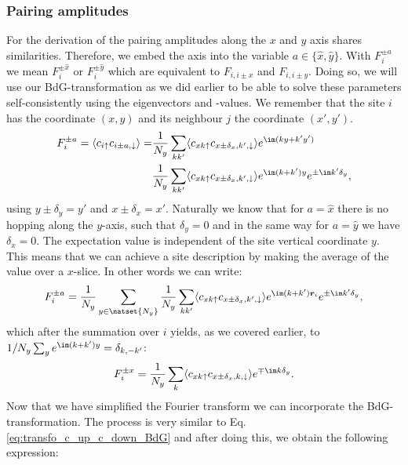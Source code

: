 \documentclass[../main.tex]{subfile}
\begin{document}
\subsubsection{Pairing amplitudes}
For the derivation of the pairing amplitudes along the $x$ and $y$ axis shares similarities. Therefore, we embed the axis into the variable $a\in\{\hat{x},\hat{y}\}$.
With $F_i^{\pm a}$ we mean $F_i^{\pm \hat{x}}$ or $F_i^{\pm \hat{y}}$ which are equivalent to $F_{i,i\pm x}$ and $F_{i,i\pm y}$.
Doing so, we will use our BdG-transformation as we did earlier to be 
able to solve these parameters self-consistently using the eigenvectors and -values. We remember that the site $i$ has the coordinate $(x,y)$ and its neighbour $j$
the coordinate $(x',y')$.
\begin{align*}
    F_i^{\pm a} = \langle c_{i\uparrow} c_{i\pm a,\downarrow}\rangle =& \frac{1}{N_y} \sum_{kk'} \langle c_{x k\uparrow} c_{x\pm \delta_x,k',\downarrow} \rangle e^{\im(ky + k'y')}\\
                                                                    &   \frac{1}{N_y} \sum_{kk'} \langle c_{x k\uparrow} c_{x\pm \delta_x,k',\downarrow} \rangle e^{\im(k + k')y} e^{\pm\im k' \delta_y},
\end{align*}
using $y\pm \delta_y = y'$ and $x\pm \delta_x = x'$. Naturally we know that for $a = \hat{x}$ there is no hopping along the $y$-axis, such that $\delta_y=0$ and in the same way for $a = \hat{y}$ we have $\delta_x = 0$.
The expectation value is independent of the site vertical coordinate $y$. This means that we can achieve a site description 
by making the average of the value over a $x$-slice. In other words
we can write:
\begin{equation*}
    F^{\pm a}_i = 
    \frac{1}{N_y}\sum_{y\in\natset{N_y}} \frac{1}{N_y} \sum_{kk'} \langle c_{x k\uparrow} c_{x \pm \delta_x,k',\downarrow} \rangle e^{\im(k + k')\bm{r}_i} e^{\pm\im k'\delta_y},
\end{equation*}
which after the summation over $i$ yields, as we covered earlier, to $1/N_y \sum_{y} e^{\im(k + k')y} = \delta_{k,-k'}$:
\begin{equation*}
    F^{\pm x}_i = 
    \frac{1}{N_y} \sum_{k} \langle c_{x k\uparrow} c_{x\pm \delta_x,k,\downarrow} \rangle e^{\mp\im k\delta_y}.
\end{equation*}
Now that we have simplified the Fourier transform we can incorporate the BdG-transformation. The process is very similar to Eq. \ref{eq:transfo_c_up_c_down_BdG} and after doing this,
we obtain the following expression:
\end{document}
